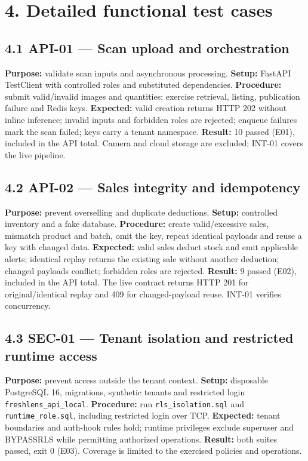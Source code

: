 \documentclass[
  11pt,
]{article}
\begin{document}
\section{4. Detailed functional test
cases}\label{detailed-functional-test-cases}

\subsection{4.1 API-01 --- Scan upload and
orchestration}\label{api-01-scan-upload-and-orchestration}

\textbf{Purpose:} validate scan inputs and asynchronous processing.
\textbf{Setup:} FastAPI TestClient with controlled roles and substituted
dependencies. \textbf{Procedure:} submit valid/invalid images and
quantities; exercise retrieval, listing, publication failure and Redis
keys. \textbf{Expected:} valid creation returns HTTP 202 without inline
inference; invalid inputs and forbidden roles are rejected; enqueue
failures mark the scan failed; keys carry a tenant namespace.
\textbf{Result:} 10 passed (E01), included in the API total. Camera and
cloud storage are excluded; INT-01 covers the live pipeline.

\subsection{4.2 API-02 --- Sales integrity and
idempotency}\label{api-02-sales-integrity-and-idempotency}

\textbf{Purpose:} prevent overselling and duplicate deductions.
\textbf{Setup:} controlled inventory and a fake database.
\textbf{Procedure:} create valid/excessive sales, mismatch product and
batch, omit the key, repeat identical payloads and reuse a key with
changed data. \textbf{Expected:} valid sales deduct stock and emit
applicable alerts; identical replay returns the existing sale without
another deduction; changed payloads conflict; forbidden roles are
rejected. \textbf{Result:} 9 passed (E02), included in the API total.
The live contract returns HTTP 201 for original/identical replay and 409
for changed-payload reuse. INT-01 verifies concurrency.

\subsection{4.3 SEC-01 --- Tenant isolation and restricted runtime
access}\label{sec-01-tenant-isolation-and-restricted-runtime-access}

\textbf{Purpose:} prevent access outside the tenant context.
\textbf{Setup:} disposable PostgreSQL 16, migrations, synthetic tenants
and restricted login \texttt{freshlens\_api\_local}. \textbf{Procedure:}
run \texttt{rls\_isolation.sql} and \texttt{runtime\_role.sql},
including restricted login over TCP. \textbf{Expected:} tenant
boundaries and auth-hook rules hold; runtime privileges exclude
superuser and BYPASSRLS while permitting authorized operations.
\textbf{Result:} both suites passed, exit 0 (E03). Coverage is limited
to the exercised policies and operations.
\end{document}
